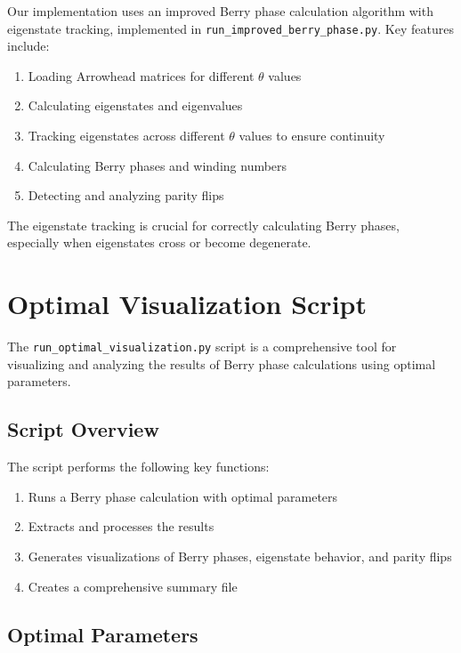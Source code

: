 \documentclass{article}
\begin{document}
Our implementation uses an improved Berry phase calculation algorithm with eigenstate tracking, implemented in \texttt{run\_improved\_berry\_phase.py}. Key features include:

\begin{enumerate}
    \item Loading Arrowhead matrices for different $\theta$ values
    \item Calculating eigenstates and eigenvalues
    \item Tracking eigenstates across different $\theta$ values to ensure continuity
    \item Calculating Berry phases and winding numbers
    \item Detecting and analyzing parity flips
\end{enumerate}

The eigenstate tracking is crucial for correctly calculating Berry phases, especially when eigenstates cross or become degenerate.

\section{Optimal Visualization Script}

The \texttt{run\_optimal\_visualization.py} script is a comprehensive tool for visualizing and analyzing the results of Berry phase calculations using optimal parameters.

\subsection{Script Overview}

The script performs the following key functions:

\begin{enumerate}
    \item Runs a Berry phase calculation with optimal parameters
    \item Extracts and processes the results
    \item Generates visualizations of Berry phases, eigenstate behavior, and parity flips
    \item Creates a comprehensive summary file
\end{enumerate}

\subsection{Optimal Parameters}
\end{document}
